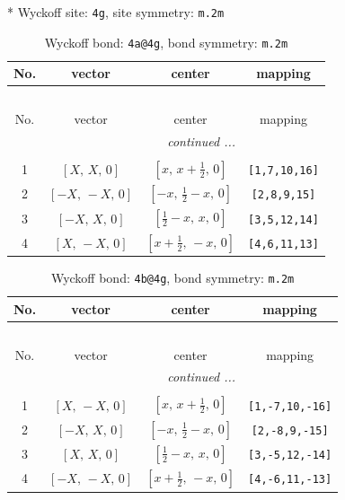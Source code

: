 \documentclass[fleqn,8pt]{jsarticle}
\begin{document}
* Wyckoff site: {\tt 4g}, site symmetry: {\tt m.2m}
\renewcommand{\arraystretch}{1.2}
\begin{longtable}{cccc}
\caption{Wyckoff bond: {\tt 4a@4g}, bond symmetry: {\tt m.2m}}
 \\
 \hline \hline
No. & vector & center & mapping \\ \hline \endfirsthead

\multicolumn{3}{l}{\tablename\ \thetable{}} \\
 \hline \hline
No. & vector & center & mapping \\ \hline \endhead

 \hline \hline
\multicolumn{3}{r}{\footnotesize\it continued ...} \\ \endfoot

 \hline \hline
\multicolumn{3}{r}{} \\ \endlastfoot

1 & $\left[ X,\, X,\, 0 \right]$ & $\left[ x,\, x + \frac{1}{2},\, 0 \right]$ & {\tt [1,7,10,16]} \\ \hline
2 & $\left[ - X,\, - X,\, 0 \right]$ & $\left[ - x,\, \frac{1}{2} - x,\, 0 \right]$ & {\tt [2,8,9,15]} \\ \hline
3 & $\left[ - X,\, X,\, 0 \right]$ & $\left[ \frac{1}{2} - x,\, x,\, 0 \right]$ & {\tt [3,5,12,14]} \\ \hline
4 & $\left[ X,\, - X,\, 0 \right]$ & $\left[ x + \frac{1}{2},\, - x,\, 0 \right]$ & {\tt [4,6,11,13]} \\
\end{longtable}
\renewcommand{\arraystretch}{1.2}
\begin{longtable}{cccc}
\caption{Wyckoff bond: {\tt 4b@4g}, bond symmetry: {\tt m.2m}}
 \\
 \hline \hline
No. & vector & center & mapping \\ \hline \endfirsthead

\multicolumn{3}{l}{\tablename\ \thetable{}} \\
 \hline \hline
No. & vector & center & mapping \\ \hline \endhead

 \hline \hline
\multicolumn{3}{r}{\footnotesize\it continued ...} \\ \endfoot

 \hline \hline
\multicolumn{3}{r}{} \\ \endlastfoot

1 & $\left[ X,\, - X,\, 0 \right]$ & $\left[ x,\, x + \frac{1}{2},\, 0 \right]$ & {\tt [1,-7,10,-16]} \\ \hline
2 & $\left[ - X,\, X,\, 0 \right]$ & $\left[ - x,\, \frac{1}{2} - x,\, 0 \right]$ & {\tt [2,-8,9,-15]} \\ \hline
3 & $\left[ X,\, X,\, 0 \right]$ & $\left[ \frac{1}{2} - x,\, x,\, 0 \right]$ & {\tt [3,-5,12,-14]} \\ \hline
4 & $\left[ - X,\, - X,\, 0 \right]$ & $\left[ x + \frac{1}{2},\, - x,\, 0 \right]$ & {\tt [4,-6,11,-13]} \\
\end{longtable}
\end{document}
